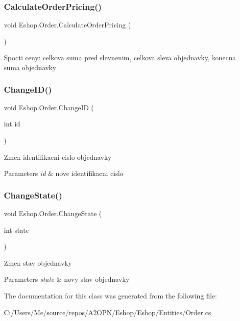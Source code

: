 \subsubsection{\texorpdfstring{CalculateOrderPricing()}{CalculateOrderPricing()}}
{\footnotesize\ttfamily void Eshop.\+Order.\+Calculate\+Order\+Pricing (\begin{DoxyParamCaption}{ }\end{DoxyParamCaption})}



Spocti ceny\+: celkova suma pred slevnenim, celkova sleva objednavky, konecna suma objednavky 

\mbox{\label{class_eshop_1_1_order_a7fee74a9ab6d7a0f97e913a5a7d327b8}} 
\subsubsection{\texorpdfstring{ChangeID()}{ChangeID()}}
{\footnotesize\ttfamily void Eshop.\+Order.\+Change\+ID (\begin{DoxyParamCaption}\item[{int}]{id }\end{DoxyParamCaption})}



Zmen identifikacni cislo objednavky 


\begin{DoxyParams}{Parameters}
{\em id} & nove identifikacni cislo\\
\hline
\end{DoxyParams}
\mbox{\label{class_eshop_1_1_order_a33412d95cfca5324b7f0c15daea7f3f4}} 
\subsubsection{\texorpdfstring{ChangeState()}{ChangeState()}}
{\footnotesize\ttfamily void Eshop.\+Order.\+Change\+State (\begin{DoxyParamCaption}\item[{int}]{state }\end{DoxyParamCaption})}



Zmen stav objednavky 


\begin{DoxyParams}{Parameters}
{\em state} & novy stav objednavky\\
\hline
\end{DoxyParams}


The documentation for this class was generated from the following file\+:\begin{DoxyCompactItemize}
\item 
C\+:/\+Users/\+Me/source/repos/\+A2\+O\+P\+N/\+Eshop/\+Eshop/\+Entities/Order.\+cs\end{DoxyCompactItemize}

